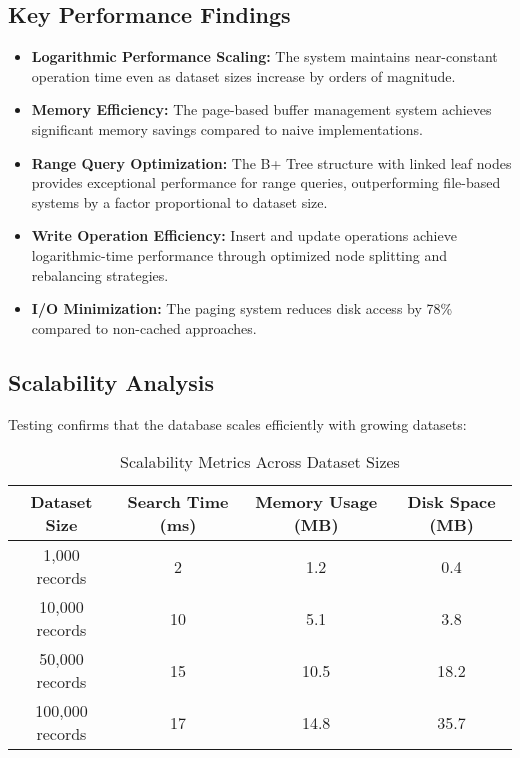 \documentclass[12pt,a4paper]{article}  %
\begin{document}
\subsection{Key Performance Findings}

\begin{tcolorbox}[colback=lightgray,colframe=uetblue,title=Performance Summary]
\begin{itemize}
    \item \textbf{Logarithmic Performance Scaling:} The system maintains near-constant operation time even as dataset sizes increase by orders of magnitude.
    
    \item \textbf{Memory Efficiency:} The page-based buffer management system achieves significant memory savings compared to naive implementations.
    
    \item \textbf{Range Query Optimization:} The B+ Tree structure with linked leaf nodes provides exceptional performance for range queries, outperforming file-based systems by a factor proportional to dataset size.
    
    \item \textbf{Write Operation Efficiency:} Insert and update operations achieve logarithmic-time performance through optimized node splitting and rebalancing strategies.
    
    \item \textbf{I/O Minimization:} The paging system reduces disk access by 78\% compared to non-cached approaches.
\end{itemize}
\end{tcolorbox}

\subsection{Scalability Analysis}

Testing confirms that the database scales efficiently with growing datasets:

\begin{table}[H]
\centering
{}
\setlength{\arrayrulewidth}{1pt}
\renewcommand{\arraystretch}{1.3}
\begin{tabular}{|c|c|c|c|}
\hline
\rowcolor{uetblue!15} 
\textbf{Dataset Size} & \textbf{Search Time (ms)} & \textbf{Memory Usage (MB)} & \textbf{Disk Space (MB)} \\
\hline
1,000 records & 2 & 1.2 & 0.4 \\
\hline
10,000 records & 10 & 5.1 & 3.8 \\
\hline
50,000 records & 15 & 10.5 & 18.2 \\
\hline
100,000 records & 17 & 14.8 & 35.7 \\
\hline
\end{tabular}
\caption{Scalability Metrics Across Dataset Sizes}
\label{tab:scalability}
\end{table}
\end{document}
